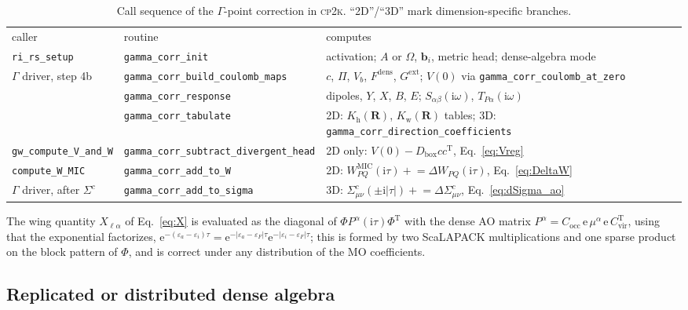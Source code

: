 \documentclass[%
 reprint,
superscriptaddress,
 amsmath,amssymb,
 aps,
prb,
]{revtex4-2}
\newcommand{\bR}{\mathbf{R}}
\newcommand{\ii}{\mathrm{i}}
\newcommand{\ee}{\mathrm{e}}
\newcommand{\MIC}{\mathrm{MIC}}
\newcommand{\Tr}{\mathrm{T}}
\newcommand{\head}{\mathrm{h}}
\newcommand{\wing}{\mathrm{w}}
\newcommand{\occ}{\mathrm{occ}}
\newcommand{\vir}{\mathrm{vir}}
\newcommand{\dens}{\mathrm{dens}}
\newcommand{\ext}{\mathrm{ext}}
\newcommand{\cpk}{\textsc{cp2k}}
\begin{document}
\begin{table}
\caption{Call sequence of the $\Gamma$-point correction in \cpk{}. ``2D''/``3D'' mark
dimension-specific branches.}
\label{tab:calls}
\footnotesize
\begin{ruledtabular}
\begin{tabular}{>{\raggedright}p{}>{\raggedright}p{}>{\raggedright\arraybackslash}p{}}
caller & routine & computes \\
\colrule
\texttt{ri\_rs\_setup} & \texttt{gamma\_corr\_init} & activation; $A$ or $\Omega$, $\mathbf b_i$, metric head; dense-algebra mode\\
$\Gamma$ driver, step 4b & \texttt{gamma\_corr\_build\_coulomb\_maps} & $c$, $\Pi$, $V_b$, $F^\dens$, $G^\ext$; $V(0)$ via \texttt{gamma\_corr\_coulomb\_at\_zero}\\
 & \texttt{gamma\_corr\_response} & dipoles, $Y$, $X$, $B$, $E$; $S_{\alpha\beta}(\ii\omega)$, $T_{P\alpha}(\ii\omega)$\\
 & \texttt{gamma\_corr\_tabulate} & 2D: $K_\head(\bR)$, $K_\wing(\bR)$ tables; 3D: \texttt{gamma\_corr\_direction\_coefficients}\\
\texttt{gw\_compute\_V\_and\_W} & \texttt{gamma\_corr\_subtract\_divergent\_head} & 2D only: $V(0)-D_\mathrm{box}cc^\Tr$, Eq.~\eqref{eq:Vreg}\\
\texttt{compute\_W\_MIC} & \texttt{gamma\_corr\_add\_to\_W} & 2D: $W^\MIC_{PQ}(\ii\tau) \mathrel{+}= \Delta W_{PQ}(\ii\tau)$, Eq.~\eqref{eq:DeltaW}\\
$\Gamma$ driver, after $\Sigma^c$ & \texttt{gamma\_corr\_add\_to\_sigma} & 3D: $\Sigma^c_{\mu\nu}(\pm\ii|\tau|) \mathrel{+}= \Delta\Sigma^c_{\mu\nu}$, Eq.~\eqref{eq:dSigma_ao}\\
\end{tabular}
\end{ruledtabular}
\end{table}

The wing quantity $X_{\ell\alpha}$ of Eq.~\eqref{eq:X} is evaluated as the diagonal of
$\Phi P^\alpha(\ii\tau)\Phi^\Tr$ with the dense AO matrix
$P^\alpha = C_\occ\,\ee\,\mu^\alpha\,\ee\,C_\vir^\Tr$, using that the exponential factorizes,
$\ee^{-(\varepsilon_a-\varepsilon_i)\tau} = \ee^{-|\varepsilon_a-\varepsilon_F|\tau}\ee^{-|\varepsilon_i-\varepsilon_F|\tau}$;
this is formed by two ScaLAPACK multiplications and one sparse product on the block pattern
of $\Phi$, and is correct under any distribution of the MO coefficients.

\subsection{Replicated or distributed dense algebra}
\label{sec:dense}
\end{document}
